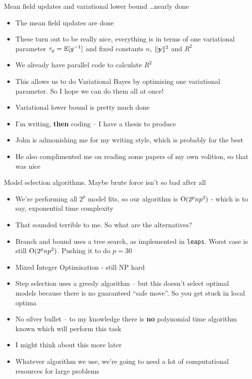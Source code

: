 \documentclass{beamer}
\begin{document}
\begin{frame}{Mean field updates and variational lower bound \ldots nearly done}
\begin{itemize}
\item The mean field updates are done
\item These turn out to be really nice, everything is in terms of 
			one variational parameter $\tau_g = \mathbb{E} [g^{-1}]$ and fixed constants $n$, $\|{\bf y}\|^2$ and $R^2$
\item We already have parallel code	to calculate $R^2$
\item This allows us to do Variational Bayes by optimising one variational parameter. So I hope we can do 
			them all at once!
\item Variational lower bound is pretty much done
\item I'm writing, \textbf{then} coding -- I have a thesis to produce
\item John is admonishing me for my writing style, which is probably for the best
\item He also complimented me on reading some papers of my own volition, so that was nice
\end{itemize}
\end{frame}

\begin{frame}{Model selection algorithms. Maybe brute force isn't so bad after all}
\begin{itemize}
\item We're performing all $2^p$ model fits, so our algorithm is $\text{O}(2^p n p^2)$ - which is to say,
			exponential time complexity
\item That sounded terrible to me. So what are the alternatives?
\item Branch and bound uses a tree search, as implemented in \texttt{leaps}. Worst case is still
			$\text{O}(2^p n p^2)$. Pushing it to do $p = 30$
\item Mixed Integer Optimisation - still NP hard
\item Step selection uses a greedy algorithm -- but this doesn't select optimal models because there is no
			guaranteed ``safe move''. So you get stuck in local optima
\item No silver bullet -- to my knowledge there is \textbf{no} polynomial time algorithm known which
			will perform this task
\item I might think about this more later
\item Whatever algorithm we use, we're going to need a lot of computational resources for large problems
\end{itemize}
\end{frame}
\end{document}

